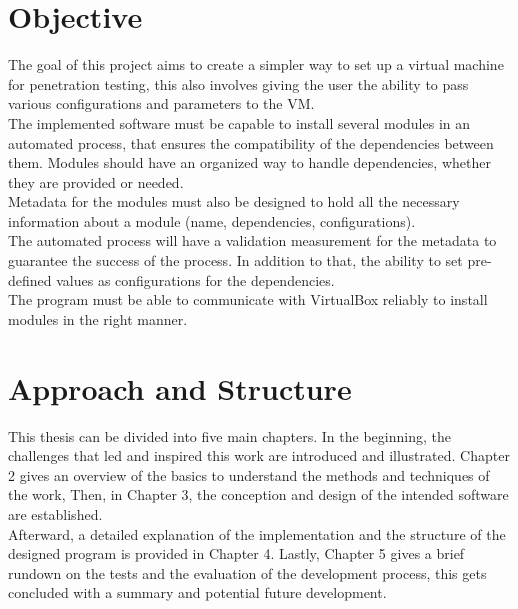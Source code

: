 \section{Objective}
The goal of this project aims to create a simpler way to set up a virtual machine for penetration testing, this also involves giving the user the ability to pass various configurations and parameters to the VM.\\
The implemented software must be capable to install several modules in an automated process, that ensures the compatibility of the dependencies between them. Modules should have an organized way to handle dependencies, whether they are provided or needed.\\
Metadata for the modules must also be designed to hold all the necessary information about a module (name, dependencies, configurations).\\
The automated process will have a validation measurement for the metadata to guarantee the success of the process. In addition to that, the ability to set pre-defined values as configurations for the dependencies.\\
The program must be able to communicate with VirtualBox reliably to install modules in the right manner.



\section{Approach and Structure}
This thesis can be divided into five main chapters. In the beginning, the challenges that led and inspired this work are introduced and illustrated. Chapter 2 gives an overview of the basics to understand the methods and techniques of the work, Then, in Chapter 3, the conception and design of the intended software are established.\\
Afterward, a detailed explanation of the implementation and the structure of the designed program is provided in Chapter 4. Lastly, Chapter 5 gives a brief rundown on the tests and the evaluation of the development process, this gets concluded with a summary and potential future development.
